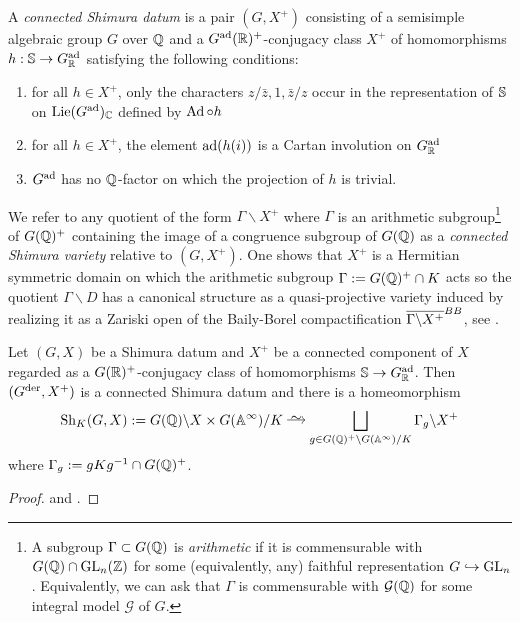 \documentclass[main.tex]{subfiles}
\begin{document}
\begin{defn}
A \textit{connected Shimura datum} is a pair $(G, X^+)$ consisting of a semisimple algebraic group $G$ over $\mathbb{Q}$ and a $G^{\operatorname{\mathrm{ad}}}(\mathbb{R})^+$-conjugacy class $X^+$ of homomorphisms $h : \mathbb{S} \to G_{\mathbb{R}}^{\operatorname{\mathrm{ad}}}$ satisfying the following conditions:
\begin{enumerate}
\item[(SV1)] for all $h \in X^+$, only the characters $z/\bar{z},1,\bar{z}/z$ occur in the representation of $\mathbb{S}$ on $\mathrm{Lie}(G^{\operatorname{\mathrm{ad}}})_{\mathbb{C}}$ defined by $\operatorname{\mathrm{Ad}} \circ h$
\item[(SV2)] for all $h \in X^+$, the element $\operatorname{\mathrm{ad}}(h(i))$ is a Cartan involution on $G_{\mathbb{R}}^{\operatorname{\mathrm{ad}}}$
\item[(SV3)] $G^{\operatorname{\mathrm{ad}}}$ has no $\mathbb{Q}$-factor on which the projection of $h$ is trivial.
\end{enumerate}
\end{defn}

We refer to any quotient of the form $\Gamma \backslash X^+$ where $\Gamma$ is an arithmetic subgroup\footnote{A subgroup $\Gamma \subset G(\mathbb{Q})$ is \textit{arithmetic} if it is commensurable with $G(\mathbb{Q}) \cap \mathrm{GL}_n(\mathbb{Z})$ for some (equivalently, any) faithful representation $G \hookrightarrow \mathrm{GL}_n$. Equivalently, we can ask that $\Gamma$ is commensurable with $\mathcal{G}(\mathbb{Q})$ for some integral model $\mathcal{G}$ of $G$.} of $G(\mathbb{Q})^+$ containing the image of a congruence subgroup of $G(\mathbb{Q})$ 
as a \textit{connected Shimura variety} relative to $(G, X^+)$.
One shows that $X^+$ is a Hermitian symmetric domain \cite[Proposition~4.8]{milne:shimura_varieties} on which the arithmetic subgroup $\Gamma := G(\mathbb{Q})^+ \cap K$ acts so the quotient $\Gamma \backslash D$ has a canonical structure as a quasi-projective variety induced by realizing it as a Zariski open of the Baily-Borel compactification $\overline{\Gamma \backslash X^+}^{BB}$, see \cite[Theorem~3.12]{milne:shimura_varieties}. 

\begin{prop} 
Let $(G, X)$ be a Shimura datum and $X^+$ be a connected component of $X$ regarded as a $G(\mathbb{R})^+$-conjugacy class of homomorphisms $\mathbb{S} \to G^{\operatorname{\mathrm{ad}}}_{\mathbb{R}}$. Then $(G^{\mathrm{der}}, X^+)$  is a connected Shimura datum and there is a homeomorphism
\[ \Sh_K(G, X) := G(\Q) \backslash X \times G(\A^{\infty}) / K \iso \bigsqcup_{g \in G(\Q)^+ \backslash G(\A^{\infty}) / K} \Gamma_g \backslash X^+ \]
where $\Gamma_g := g K g^{-1} \cap G(\mathbb{Q})^+$.
\end{prop}

\begin{proof}
\cite[Corollary~5.8]{milne:shimura_varieties} and \cite[Lemma~5.13]{milne:shimura_varieties}.
\end{proof}
\end{document}
